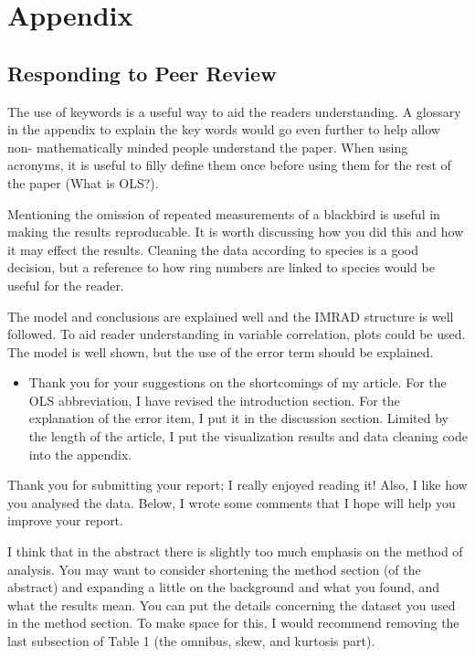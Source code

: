 \section*{Appendix}
\subsection{Responding to Peer Review}
The use of keywords is a useful way to aid the readers understanding. A glossary in the appendix to explain the key words would go even further to help allow non- mathematically minded people understand the paper. When using acronyms, it is useful to filly define them once before using them for the rest of the paper (What is OLS?).

Mentioning the omission of repeated measurements of a blackbird is useful in making the results reproducable. It is worth discussing how you did this and how it may effect the results. Cleaning the data according to species is a good decision, but a reference to how ring numbers are linked to species would be useful for the reader.

The model and conclusions are explained well and the IMRAD structure is well followed. To aid reader understanding in variable correlation, plots could be used. The model is well shown, but the use of the error term should be explained.

\begin{itemize}
	\item \textcolor[rgb]{1,0,0}{Thank you for your suggestions on the shortcomings of my article. For the OLS abbreviation, I have revised the introduction section. For the explanation of the error item, I put it in the discussion section. Limited by the length of the article, I put the visualization results and data cleaning code into the appendix.}
\end{itemize}

\newpage

Thank you for submitting your report; I really enjoyed reading it! Also, I like how you analysed the data. Below, I wrote some comments that I hope will help you improve your report.

I think that in the abstract there is slightly too much emphasis on the method of analysis. You may want to consider shortening the method section (of the abstract) and expanding a little on the background and what you found, and what the results mean. You can put the details concerning the dataset you used in the method section. To make space for this, I would recommend removing the last subsection of Table 1 (the omnibus, skew, and kurtosis part).

